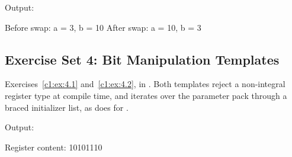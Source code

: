 
\noindent Output:

\begin{console}
Before swap: a = 3, b = 10
After swap: a = 10, b = 3
\end{console}

\subsection{Exercise Set 4: Bit Manipulation Templates}
\label{sol:set:c1.4}
Exercises~\ref{c1:ex:4.1} and~\ref{c1:ex:4.2}, in .
Both templates reject a non-integral register type at compile time, and  iterates
over the parameter pack through a braced initializer list, as  does for
.


\noindent Output:

\begin{console}
Register content: 10101110
\end{console}
